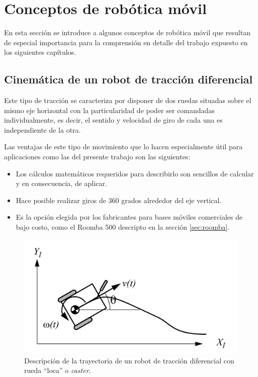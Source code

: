\newpage

\section{Conceptos de robótica móvil}

En esta sección se introduce a algunos conceptos de robótica móvil que resultan de especial importancia para la comprensión en detalle del trabajo expuesto en los siguientes capítulos.

\subsection{Cinemática de un robot de tracción diferencial}

Este tipo de tracción se caracteriza por disponer de dos ruedas situadas sobre el mismo eje horizontal con la particularidad de poder ser comandadas individualmente, es decir, el sentido y velocidad de giro de cada una es independiente de la otra.

Las ventajas de este tipo de movimiento que lo hacen especialmente útil para aplicaciones como las del presente trabajo son las siguientes:

\begin{itemize}
    \item Los cálculos matemáticos requeridos para describirlo son sencillos de calcular y en consecuencia, de aplicar.
    \item Hace posible realizar giros de 360 grados alrededor del eje vertical.
    \item Es la opción elegida por los fabricantes para bases móviles comerciales de bajo costo, como el Roomba 500 descripto en la sección \ref{sec:roomba}.
\end{itemize}

\begin{figure}[ht]
    \centering
    \includegraphics[scale=0.8]{./Figures/diff_drive.png}
    \caption{Descripción de la trayectoria de un robot de tracción diferencial con rueda ``loca'' o \textit{caster}.}
    \label{fig:diffdrive}
\end{figure}

